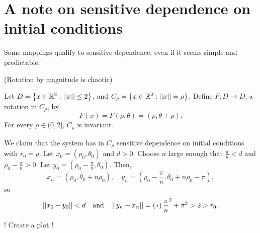 \documentclass[11pt]{book}
\begin{document}
\section{A note on sensitive dependence on initial conditions}
Some mappings qualify to sensitive dependence, even if it seems simple and predictable.

\begin{proposition}
  (Rotation by magnitude is chaotic)

  Let $D = \left \{ x \in \mathbb{R}^2: \left|\left| x \right|\right| \leq 2 \right \}$, and $C_\rho = \left \{ x \in \mathbb{R}^2: \left|\left| x \right|\right| = \rho \right \}$.
  Define $F: D \to D$, a rotation in $C_\rho$, by
  \begin{equation*}
    F(x) = F(\rho, \theta) = (\rho, \theta + \rho).
  \end{equation*}
  For every $\rho \in (0,2]$, $C_\rho$ is invariant.

  We claim that the system has in $C_\rho$ sensitive dependence on initial conditions with $r_0 = \rho$.
  Let $x_0 = (\rho_0, \theta_0)$ and $d > 0$.
  Choose $n$ large enough that $\frac{\pi}{n} < d$ and $\rho_0 - \frac{\pi}{n} > 0$.
  Let $y_0 = (\rho_0 - \frac{\pi}{n}, \theta_0)$.
  Then,
  \begin{equation*}
    x_n = (\rho_0, \theta_0 + n\rho_0),\quad
    y_n = (\rho_0 - \frac{\pi}{n}, \theta_0 + n\rho_0 - \pi),
  \end{equation*}
  so
  \begin{equation*}
    \left|\left| x_0 - y_0 \right|\right| < d \quad \mbox{and} \quad \left|\left| y_n - x_n \right|\right| = \left ( * \right ){\frac{\pi}{n}}^2 + \pi^2 > 2 > r_0.
  \end{equation*}
\end{proposition}
 
! Create a plot !



\end{document}
